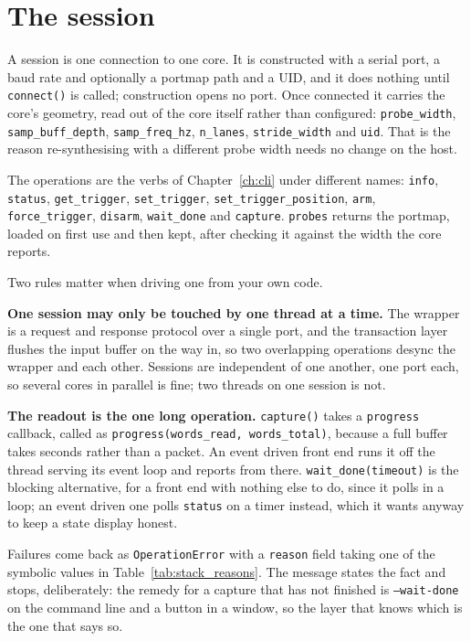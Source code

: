 \documentclass[../manual.tex]{subfiles}
\begin{document}
\section{The session}
\label{sec:stack_session}

A session is one connection to one core. It is constructed with a serial port, a baud rate and optionally a portmap path and a UID, and it does nothing until \texttt{connect()} is called; construction opens no port. Once connected it carries the core's geometry, read out of the core itself rather than configured: \texttt{probe\_width}, \texttt{samp\_buff\_depth}, \texttt{samp\_freq\_hz}, \texttt{n\_lanes}, \texttt{stride\_width} and \texttt{uid}. That is the reason re-synthesising with a different probe width needs no change on the host.

The operations are the verbs of Chapter~\ref{ch:cli} under different names: \texttt{info}, \texttt{status}, \texttt{get\_trigger}, \texttt{set\_trigger}, \texttt{set\_trigger\_position}, \texttt{arm}, \texttt{force\_trigger}, \texttt{disarm}, \texttt{wait\_done} and \texttt{capture}. \texttt{probes} returns the portmap, loaded on first use and then kept, after checking it against the width the core reports.

Two rules matter when driving one from your own code.

\textbf{One session may only be touched by one thread at a time.} The wrapper is a request and response protocol over a single port, and the transaction layer flushes the input buffer on the way in, so two overlapping operations desync the wrapper and each other. Sessions are independent of one another, one port each, so several cores in parallel is fine; two threads on one session is not.

\textbf{The readout is the one long operation.} \texttt{capture()} takes a \texttt{progress} callback, called as \mbox{\texttt{progress(words\_read, words\_total)}}, because a full buffer takes seconds rather than a packet. An event driven front end runs it off the thread serving its event loop and reports from there. \texttt{wait\_done(timeout)} is the blocking alternative, for a front end with nothing else to do, since it polls in a loop; an event driven one polls \texttt{status} on a timer instead, which it wants anyway to keep a state display honest.

Failures come back as \texttt{OperationError} with a \texttt{reason} field taking one of the symbolic values in Table~\ref{tab:stack_reasons}. The message states the fact and stops, deliberately: the remedy for a capture that has not finished is \texttt{--wait-done} on the command line and a button in a window, so the layer that knows which is the one that says so.
\end{document}
